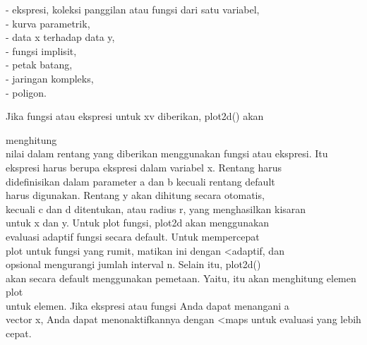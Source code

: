 \documentclass{article}
\begin{document}
\begin{eulernotebook}
\begin{eulercomment}
\begin{eulercomment}
\begin{eulercomment}
\begin{eulercomment}
\begin{eulercomment}
\begin{eulercomment}
\begin{eulercomment}
\begin{eulercomment}
\begin{eulercomment}
\begin{eulercomment}
\begin{eulercomment}
\begin{eulercomment}
\begin{eulercomment}
\begin{eulercomment}
\begin{eulercomment}
\begin{eulercomment}
\begin{eulercomment}
\begin{eulercomment}
\begin{eulercomment}
\begin{eulercomment}
\begin{eulercomment}
\begin{eulercomment}
\begin{eulercomment}
\begin{eulercomment}
\begin{eulercomment}
\begin{eulercomment}
\begin{eulercomment}
\begin{eulercomment}
\begin{eulercomment}
- ekspresi, koleksi panggilan atau fungsi dari satu variabel,\\
- kurva parametrik,\\
- data x terhadap data y,\\
- fungsi implisit,\\
- petak batang,\\
- jaringan kompleks,\\
- poligon.

\end{eulercomment}
\begin{eulerttcomment}
 Jika fungsi atau ekspresi untuk xv diberikan, plot2d() akan
\end{eulerttcomment}
\begin{eulercomment}
menghitung\\
nilai dalam rentang yang diberikan menggunakan fungsi atau ekspresi.
Itu\\
ekspresi harus berupa ekspresi dalam variabel x. Rentang harus\\
didefinisikan dalam parameter a dan b kecuali rentang default\\
[-2,2] harus digunakan. Rentang y akan dihitung secara otomatis,\\
kecuali c dan d ditentukan, atau radius r, yang menghasilkan kisaran\\
[-r,r] untuk x dan y. Untuk plot fungsi, plot2d akan menggunakan\\
evaluasi adaptif fungsi secara default. Untuk mempercepat\\
plot untuk fungsi yang rumit, matikan ini dengan \textless{}adaptif, dan\\
opsional mengurangi jumlah interval n. Selain itu, plot2d()\\
akan secara default menggunakan pemetaan. Yaitu, itu akan menghitung
elemen plot\\
untuk elemen. Jika ekspresi atau fungsi Anda dapat menangani a\\
vector x, Anda dapat menonaktifkannya dengan \textless{}maps untuk evaluasi yang
lebih cepat.


\end{eulercomment}
\end{eulercomment}
\end{eulercomment}
\end{eulercomment}
\end{eulercomment}
\end{eulercomment}
\end{eulercomment}
\end{eulercomment}
\end{eulercomment}
\end{eulercomment}
\end{eulercomment}
\end{eulercomment}
\end{eulercomment}
\end{eulercomment}
\end{eulercomment}
\end{eulercomment}
\end{eulercomment}
\end{eulercomment}
\end{eulercomment}
\end{eulercomment}
\end{eulercomment}
\end{eulercomment}
\end{eulercomment}
\end{eulercomment}
\end{eulercomment}
\end{eulercomment}
\end{eulercomment}
\end{eulercomment}
\end{eulercomment}
\end{eulernotebook}
\end{document}
